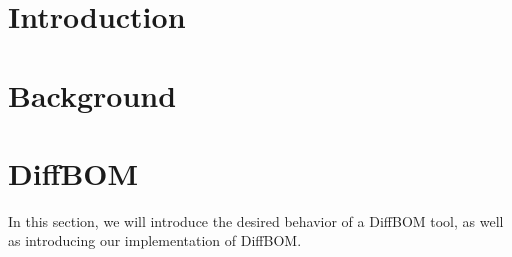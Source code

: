 \section{Introduction}


\section{Background}


\section{DiffBOM}

In this section, we will introduce the desired behavior of a DiffBOM tool, as well as introducing our implementation of DiffBOM.
